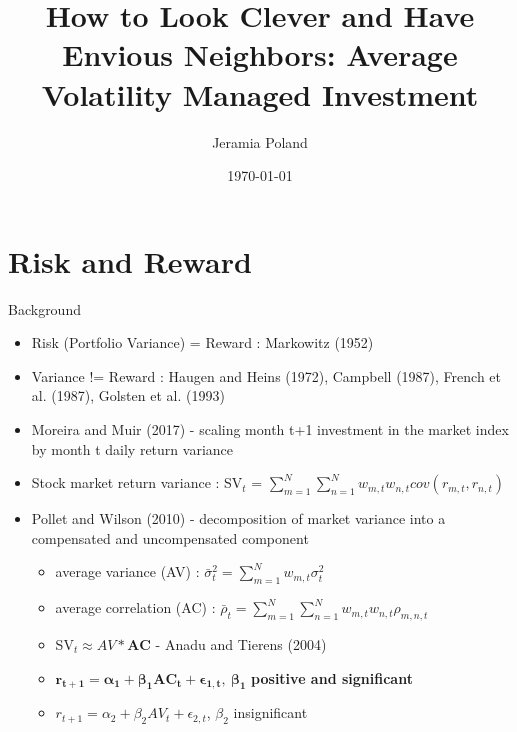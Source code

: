 \documentclass[handout]{beamer}
\begin{document}
\title[Average Variance]{How to Look Clever and Have Envious Neighbors: Average
	Volatility Managed Investment}   
\author[J. Poland]{Jeramia Poland} 
\date{\today}

\begin{frame}
\titlepage
\end{frame}

\section{Risk and Reward}
\begin{frame}{Background}
	\begin{itemize}[<+->]
		\item Risk (Portfolio Variance) = Reward : Markowitz (1952)
		\item Variance != Reward : Haugen and Heins (1972), Campbell (1987), French et al. (1987), Golsten et al. (1993)
		\item Moreira and Muir (2017) - scaling month t+1 investment in the market index by month t daily return variance
		\item Stock market return variance : SV$_{t}$ = $\sum_{m=1}^{N}\sum_{n=1}^{N}w_{m,t}w_{n,t}cov(r_{m,t},r_{n,t})$
		\item Pollet and Wilson (2010) - decomposition of market variance into a compensated and uncompensated component
		\begin{itemize}[<+->]
			\item average variance (AV) : $\bar{\sigma}^{2}_{t} = \sum_{m=1}^{N}w_{m,t}\sigma^{2}_{t}$
			\item average correlation (AC) : $\bar{\rho}_{t} = \sum_{m=1}^{N}\sum_{n=1}^{N}w_{m,t}w_{n,t}\rho_{m,n,t}$
			\item SV$_{t} \approx AV*\bm{AC}$  - Anadu and Tierens (2004)
			\item $\bm{r_{t+1} = \alpha_{1} + \beta_{1}AC_{t} + \epsilon_{1,t},~\beta_{1}}$ \textbf{positive and significant}
			\item $r_{t+1} = \alpha_{2} + \beta_{2}AV_{t} + \epsilon_{2,t}$, $\beta_{2}$ insignificant 
		\end{itemize}

\end{itemize}
\end{frame}
\end{document}
